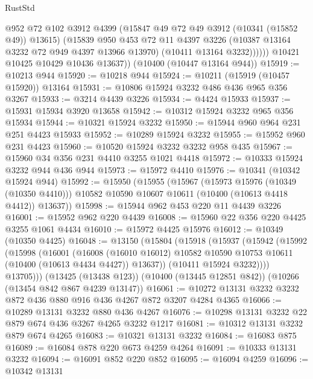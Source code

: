 \begin{lexlean}{RustStd}
\begin{coremodule}
                @952
                @72
                @102
                @3912
                @4399
                (@15847 @49 @72 @49 @3912 (@10341 (@15852 @49)) @13615)
                (@15839
                  @950
                  @453
                  @72
                  @11
                  @4397
                  @3226
                  (@10387 @13164 @3232 @72 @949 @4397 @13966 @13970)
                  (@10411 @13164 @3232))))))
        @10421
        @10425
        @10429
        @10436
        @13637))
    (@10400 (@10447 @13164 @944))
@15919 := @10213 @944
@15920 := @10218 @944
@15924 := @10211 (@15919 (@10457 @15920)) @13164
@15931 := @10806 @15924 @3232 @486 @436 @965 @356 @3267
@15933 := @3214 @4439 @3226
@15934 := @4424 @15933
@15937 := @15931 @15934 @3920 @13658
@15942 := @10312 @15924 @3232 @965 @356 @15934
@15944 := @10321 @15924 @3232
@15950 := @15944 @960 @964 @231 @251 @4423 @15933
@15952 := @10289 @15924 @3232
@15955 := @15952 @960 @231 @4423
@15960 := @10520 @15924 @3232 @3232 @958 @435
@15967 := @15960 @34 @356 @231 @4410 @3255 @1021 @4418
@15972 := @10333 @15924 @3232 @944 @436 @944
@15973 := @15972 @4410
@15976 := @10341 (@10342 @15924 @944)
@15992 := @15950
    (@15955
      (@15967
        (@15973 @15976 (@10349 (@10350 @4410)))
        @10582
        @10590
        @10607
        @10611
        (@10400 (@10613 @4418 @4412))
        @13637))
@15998 := @15944 @962 @453 @220 @11 @4439 @3226
@16001 := @15952 @962 @220 @4439
@16008 := @15960 @22 @356 @220 @4425 @3255 @1061 @4434
@16010 := @15972 @4425 @15976
@16012 := @10349 (@10350 @4425)
@16048 := @13150
    (@15804
      (@15918
        (@15937
          (@15942
            (@15992
              (@15998
                (@16001
                  (@16008
                    (@16010 @16012)
                    @10582
                    @10590
                    @10753
                    @10611
                    (@10400 (@10613 @4434 @4427))
                    @13637))
                (@10411 @15924 @3232))))
          @13705)))
    (@13425 (@13438 @123))
    (@10400 (@13445 @12851 @842))
    (@10266 (@13454 @842 @867 @4239 @13147))
@16061 := @10272 @13131 @3232 @3232 @872 @436 @880 @916 @436 @4267 @872 @3207 @4284 @4365
@16066 := @10289 @13131 @3232 @880 @436 @4267
@16076 := @10298 @13131 @3232 @22 @879 @674 @436 @3267 @4265 @3232 @1217
@16081 := @10312 @13131 @3232 @879 @674 @4265
@16083 := @10321 @13131 @3232
@16084 := @16083 @875
@16089 := @16084 @878 @220 @673 @4259 @4264
@16091 := @10333 @13131 @3232
@16094 := @16091 @852 @220 @852
@16095 := @16094 @4259
@16096 := @10342 @13131

\end{coremodule}
\end{lexlean}

